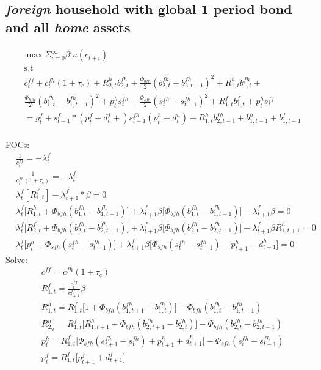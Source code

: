\documentclass[a4paper]{article}
\begin{document}
\subsection{\emph{foreign} household with global 1 period bond and all \emph{home} assets}
\begin{align*}
&\max \Sigma_{i=0}^\infty \beta^i u(c_{t+i})\\ &\text{s.t}\\
&c^{ff}_t+c^{fh}_t(1+\tau_c)+R^h_{2,t} b^{fh}_{2,t} + \frac{\Phi_{bfh}}{2}(b^{fh}_{2,t}-b^{fh}_{2,t-1})^2 +
R^h_{1,t} b^{fh}_{1,t} + \\ 
&\frac{\Phi_{bfh}}{2}(b^{fh}_{1,t}-b^{fh}_{1,t-1})^2 + p^{h}_t s^{fh}_t+\frac{\Phi_{sfh}}{2}(s^{fh}_t-s^{fh}_{t-1})^2+R^f_{1,t}b^f_{1,t}+p^h_t s^{ff}_t\\&=g^f_t+s^f_{t-1}*(p^f_t+d^f_t+)s^{fh}_{t-1}(p^{h}_t+d^{h}_t)+R^{h}_{1,t}b^{fh}_{2,t-1}+b^h_{1,t-1}+b^f_{1,t-1}\\
\end{align*}


FOCs:
\begin{align*}
&\frac{1}{c^{ff}_t}=-\lambda^f_t\\
&\frac{1}{c^{fh}_t(1+\tau_c)}=-\lambda^f_t \\
&\lambda^f_t [R^f_{1,t}]-\lambda^f_{t+1}*\beta=0\\
&\lambda^f_t\big[R^h_{1,t}+\Phi_{bfh} (b^{fh}_{1,t}-b^{fh}_{1,t-1})\big ]+ \lambda^f_{t+1} \beta \big[\Phi_{bfh} (b^{fh}_{1,t} - b^{fh}_{1,t+1})]-\lambda^f_{t+1}\beta =0\\
&\lambda^f_t\big[R^f_{2,t}+\Phi_{bfh} (b^{fh}_{2,t}-b^{fh}_{2,t-1})\big ]+ \lambda^f_{t+1} \beta \big[\Phi_{bfh} (b^{fh}_{2,t} - b^{fh}_{2,t+1})]-\lambda^f_{t+1}\beta R^{h}_{1,t+1}=0\\
&\lambda^f_t \big[p^{h}_t + \Phi_{sfh} (s^{fh}_t-s^{fh}_{t-1})\big] + \lambda^f_{t+1} \beta \big[\Phi_{sfh}  (s^{fh}_t-s^{fh}_{t+1}) - p^{h}_{t+1}-d^{h}_{t+1}\big]=0
\end{align*}
Solve:
\begin{align}
&c^{ff}=c^{fh}(1+\tau_c)\\
&R^f_{1,t}=\frac{c^{ff}_t}{c^{ff}_{t+1}}\beta\\
&R^h_{1,t}=R^f_{1,t} \big[1+\Phi_{bfh} (b^{fh}_{1,t+1} - b^{fh}_{1,t})\big] -\Phi_{bfh} (b^{fh}_{1,t}-b^{fh}_{1,t-1})\\
&R^h_{2,_t}=R^f_{1,t} \big[R^{h}_{1,t+1}+\Phi_{bfh} (b^{fh}_{2,t+1} - b^{fh}_{2,t})\big] -\Phi_{bfh} (b^{fh}_{2,t}-b^{fh}_{2,t-1})\\
&p^{h}_t=R^f_{1,t} \big[ \Phi_{sfh} (s^{fh}_{t+1}-s^{fh}_t)+p^{h}_{t+1}+d^{h}_{t+1} \big] - \Phi_{sfh} (s^{fh}_t - s^{fh}_{t-1})\\
&p^f_t=R^f_{1,t}\big[p^f_{t+1}+d^f_{t+1}\big]
\end{align}
\end{document}
